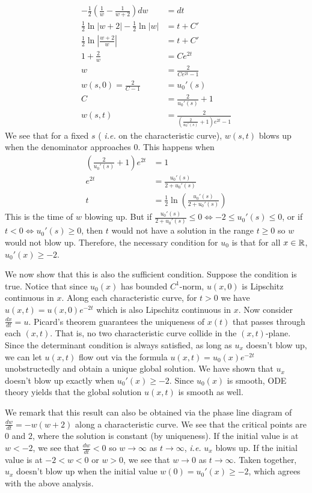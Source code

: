 \documentclass[12pt]{article}
\begin{document}
\begin{problem}[2]
\begin{enumerate}[label=(\alph*)]
\begin{align*}
	-\frac{1}{2}\left( \frac{1}{w} - \frac{1}{w+2} \right) dw &= dt \\
	\frac{1}{2} \ln |w+2| - \frac{1}{2} \ln |w| &= t+C' \\
	\frac{1}{2} \ln \left| \frac{w+2}{ w} \right| &= t+C' \\
        1+ \frac{2}{w} &= Ce^{2t} \\
	w &= \frac{2}{Ce^{2t}-1} \\
	w(s,0) = \frac{2}{C-1} &= u_0'(s) \\
	C &= \frac{2}{u_0'(s)}+1 \\
	w(s,t) &= \frac{2}{ \left( \frac{2}{u_0'(s)}+1 \right) e^{2t}-1 } 
\end{align*}
We see that for a fixed $ s$ ( \emph{i.e.} on the characteristic curve), $ w(s,t)$ blows up when the denominator approaches 0. This happens when
\begin{align*}
	\left( \frac{2}{u_0'(s)}+1 \right)e^{2t} &= 1 \\
	e^{2t} &= \frac{u_0'(s)}{2+u_0'(s) } \\
	t &= \frac{1}{2} \ln \left( \frac{u_0'(s)}{2+u_0'(s) } \right)
\end{align*}
This is the time of $ w$ blowing up. But if $ \frac{u_0'(s)}{ 2+u_0'(s)} \leq 0 \iff -2 \leq u_0'(s) \leq 0$, or if $t<0 \iff u_0'(s) \geq 0$, then $ t$ would not have a solution in the range $ t\geq 0$ so  $ w$ would not blow up. Therefore, the necessary condition for $ u_0$ is that for all  $ x \in \mathbb{R}$, $ u_0'(x) \geq -2$. 

We now show that this is also the sufficient condition. Suppose the condition is true. Notice that since $ u_0(x)$ has bounded $ C^{1}$-norm, $ u(x,0)$ is Lipschitz continuous in $ x$. Along each characteristic curve, for $ t>0$ we have $ u(x,t) = u(x,0)e^{-2t}$ which is also Lipschitz continuous in $ x$. Now consider $ \frac{d x}{d t} =u$. Picard's theorem guarantees the uniqueness of $ x(t)$ that passes through each $ (x,t)$. That is, no two characteristic curve collide in the $ (x,t)$-plane. Since the determinant condition is always satisfied, as long as $ u_x$ doesn't blow up, we can let  $ u(x,t)$ flow out via the formula $ u(x,t)=u_0(x)e^{-2t}$ unobstructedly and obtain a unique global solution. We have shown that $ u_x$ doesn't blow up exactly when $ u_0'(x) \geq -2$. Since $ u_0(x)$ is smooth, ODE theory yields that the global solution $ u(x,t)$ is smooth as well. 

We remark that this result can also be obtained via the phase line diagram of $ \frac{d w}{d t}  =-w(w+2) $ along a characteristic curve. We see that the critical points are $ 0$ and  $ 2$, where the solution is constant (by uniqueness). If the initial value is at $ w < -2$, we see that $ \frac{d w}{d t} <0 $ so $ w \to \infty$ as $ t \to \infty $, \emph{i.e.} $ u_x$ blows up. If the initial value is at $-2< w<0 $ or  $ w>0$, we see that  $ w \to 0$ as $ t \to \infty$. Taken together, $ u_x$ doesn't blow up when the initial value $ w(0)= u_0'(x) \geq -2$, which agrees with the above analysis.


\end{enumerate}
\end{problem}
\end{document}
